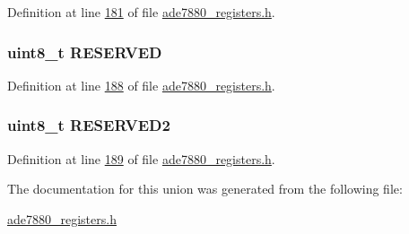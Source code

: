Definition at line \hyperlink{a00036_source_l00181}{181} of file \hyperlink{a00036_source}{ade7880\-\_\-registers.\-h}.

\hypertarget{a00023_ad5d4752b467b6c64a9b5fa14d65c71b2}{
\subsubsection[{R\-E\-S\-E\-R\-V\-E\-D}]{\setlength{\rightskip}{0pt plus 5cm}uint8\-\_\-t R\-E\-S\-E\-R\-V\-E\-D}}\label{d3/d52/a00023_ad5d4752b467b6c64a9b5fa14d65c71b2}


Definition at line \hyperlink{a00036_source_l00188}{188} of file \hyperlink{a00036_source}{ade7880\-\_\-registers.\-h}.

\hypertarget{a00023_acfd75aa5652ddc0497f2463cd9bb9465}{
\subsubsection[{R\-E\-S\-E\-R\-V\-E\-D2}]{\setlength{\rightskip}{0pt plus 5cm}uint8\-\_\-t R\-E\-S\-E\-R\-V\-E\-D2}}\label{d3/d52/a00023_acfd75aa5652ddc0497f2463cd9bb9465}


Definition at line \hyperlink{a00036_source_l00189}{189} of file \hyperlink{a00036_source}{ade7880\-\_\-registers.\-h}.



The documentation for this union was generated from the following file\-:\begin{DoxyCompactItemize}
\item 
\hyperlink{a00036}{ade7880\-\_\-registers.\-h}\end{DoxyCompactItemize}
